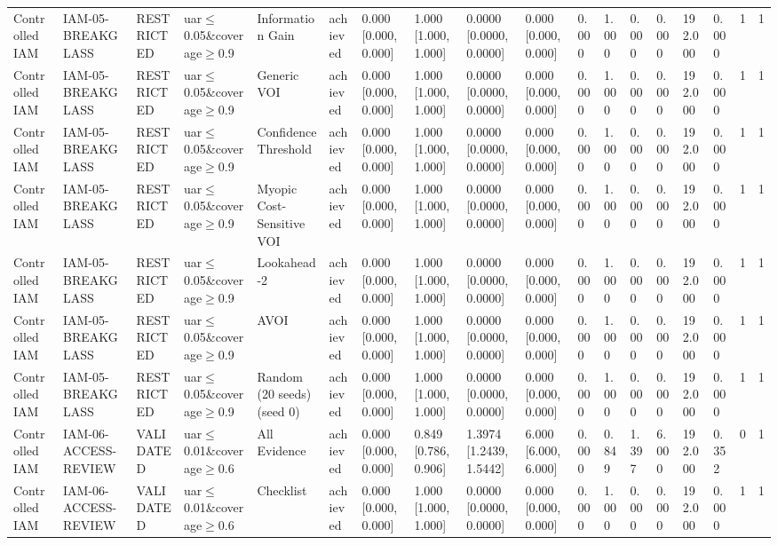\begin{table}[!ht]
{\begin{tabular}{llllllllllllllllll}
Controlled IAM & IAM-05-BREAKGLASS & RESTRICTED & uar$\le$0.05\&coverage$\ge$0.9 & Information Gain & achieved & 0.000 [0.000, 0.000] & 1.000 [1.000, 1.000] & 0.0000 [0.0000, 0.0000] & 0.000 [0.000, 0.000] & 0.000 & 1.000 & 0.000 & 0.000 & 192.000 & 0.000 & 1 & 1 \\
Controlled IAM & IAM-05-BREAKGLASS & RESTRICTED & uar$\le$0.05\&coverage$\ge$0.9 & Generic VOI & achieved & 0.000 [0.000, 0.000] & 1.000 [1.000, 1.000] & 0.0000 [0.0000, 0.0000] & 0.000 [0.000, 0.000] & 0.000 & 1.000 & 0.000 & 0.000 & 192.000 & 0.000 & 1 & 1 \\
Controlled IAM & IAM-05-BREAKGLASS & RESTRICTED & uar$\le$0.05\&coverage$\ge$0.9 & Confidence Threshold & achieved & 0.000 [0.000, 0.000] & 1.000 [1.000, 1.000] & 0.0000 [0.0000, 0.0000] & 0.000 [0.000, 0.000] & 0.000 & 1.000 & 0.000 & 0.000 & 192.000 & 0.000 & 1 & 1 \\
Controlled IAM & IAM-05-BREAKGLASS & RESTRICTED & uar$\le$0.05\&coverage$\ge$0.9 & Myopic Cost-Sensitive VOI & achieved & 0.000 [0.000, 0.000] & 1.000 [1.000, 1.000] & 0.0000 [0.0000, 0.0000] & 0.000 [0.000, 0.000] & 0.000 & 1.000 & 0.000 & 0.000 & 192.000 & 0.000 & 1 & 1 \\
Controlled IAM & IAM-05-BREAKGLASS & RESTRICTED & uar$\le$0.05\&coverage$\ge$0.9 & Lookahead-2 & achieved & 0.000 [0.000, 0.000] & 1.000 [1.000, 1.000] & 0.0000 [0.0000, 0.0000] & 0.000 [0.000, 0.000] & 0.000 & 1.000 & 0.000 & 0.000 & 192.000 & 0.000 & 1 & 1 \\
Controlled IAM & IAM-05-BREAKGLASS & RESTRICTED & uar$\le$0.05\&coverage$\ge$0.9 & AVOI & achieved & 0.000 [0.000, 0.000] & 1.000 [1.000, 1.000] & 0.0000 [0.0000, 0.0000] & 0.000 [0.000, 0.000] & 0.000 & 1.000 & 0.000 & 0.000 & 192.000 & 0.000 & 1 & 1 \\
Controlled IAM & IAM-05-BREAKGLASS & RESTRICTED & uar$\le$0.05\&coverage$\ge$0.9 & Random (20 seeds) (seed 0) & achieved & 0.000 [0.000, 0.000] & 1.000 [1.000, 1.000] & 0.0000 [0.0000, 0.0000] & 0.000 [0.000, 0.000] & 0.000 & 1.000 & 0.000 & 0.000 & 192.000 & 0.000 & 1 & 1 \\
Controlled IAM & IAM-06-ACCESS-REVIEW & VALIDATED & uar$\le$0.01\&coverage$\ge$0.6 & All Evidence & achieved & 0.000 [0.000, 0.000] & 0.849 [0.786, 0.906] & 1.3974 [1.2439, 1.5442] & 6.000 [6.000, 6.000] & 0.000 & 0.849 & 1.397 & 6.000 & 192.000 & 0.352 & 0 & 1 \\
Controlled IAM & IAM-06-ACCESS-REVIEW & VALIDATED & uar$\le$0.01\&coverage$\ge$0.6 & Checklist & achieved & 0.000 [0.000, 0.000] & 1.000 [1.000, 1.000] & 0.0000 [0.0000, 0.0000] & 0.000 [0.000, 0.000] & 0.000 & 1.000 & 0.000 & 0.000 & 192.000 & 0.000 & 1 & 1 \\

\end{tabular}}
\end{table}
